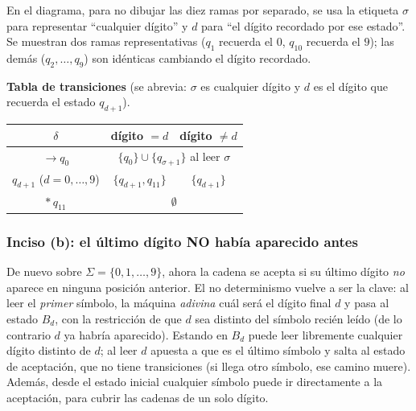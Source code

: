 \documentclass[12pt]{article}
\begin{document}
\noindent En el diagrama, para no dibujar las diez ramas por separado, se usa la etiqueta $\sigma$ para representar ``cualquier dígito'' y $d$ para ``el dígito recordado por ese estado''. Se muestran dos ramas representativas ($q_1$ recuerda el $0$, $q_{10}$ recuerda el $9$); las demás ($q_2,\dots,q_9$) son idénticas cambiando el dígito recordado.

\begin{center}
\end{center}

\noindent\textbf{Tabla de transiciones} (se abrevia: $\sigma$ es cualquier dígito y $d$ es el dígito que recuerda el estado $q_{d+1}$).
\begin{center}
\begin{tabular}{c|cc}
$\delta$ & dígito $=d$ & dígito $\neq d$\\ \hline
$\rightarrow q_0$ & \multicolumn{2}{c}{$\{q_0\}\cup\{q_{\sigma+1}\}$ al leer $\sigma$}\\ \hline
$q_{d+1}$ ($d=0,\dots,9$) & $\{q_{d+1},q_{11}\}$ & $\{q_{d+1}\}$\\ \hline
$*\,q_{11}$ & \multicolumn{2}{c}{$\emptyset$}\\
\end{tabular}
\end{center}

\subsubsection{Inciso (b): el último dígito NO había aparecido antes}

De nuevo sobre $\Sigma=\{0,1,\dots,9\}$, ahora la cadena se acepta si su último dígito \emph{no} aparece en ninguna posición anterior. El no determinismo vuelve a ser la clave: al leer el \emph{primer} símbolo, la máquina \emph{adivina} cuál será el dígito final $d$ y pasa al estado $B_d$, con la restricción de que $d$ sea distinto del símbolo recién leído (de lo contrario $d$ ya habría aparecido). Estando en $B_d$ puede leer libremente cualquier dígito distinto de $d$; al leer $d$ apuesta a que es el último símbolo y salta al estado de aceptación, que no tiene transiciones (si llega otro símbolo, ese camino muere). Además, desde el estado inicial cualquier símbolo puede ir directamente a la aceptación, para cubrir las cadenas de un solo dígito.
\end{document}
